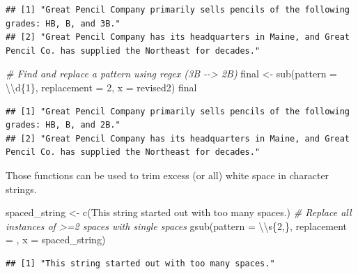 \documentclass[
]{book}
\newenvironment{Shaded}{\begin{snugshade}}{\end{snugshade}}
\newcommand{\AttributeTok}[1]{\textcolor[rgb]{0.77,0.63,0.00}{#1}}
\newcommand{\CommentTok}[1]{\textcolor[rgb]{0.56,0.35,0.01}{\textit{#1}}}
\newcommand{\FunctionTok}[1]{\textcolor[rgb]{0.00,0.00,0.00}{#1}}
\newcommand{\NormalTok}[1]{#1}
\newcommand{\OtherTok}[1]{\textcolor[rgb]{0.56,0.35,0.01}{#1}}
\newcommand{\SpecialCharTok}[1]{\textcolor[rgb]{0.00,0.00,0.00}{#1}}
\newcommand{\StringTok}[1]{\textcolor[rgb]{0.31,0.60,0.02}{#1}}
\begin{document}
\begin{verbatim}
## [1] "Great Pencil Company primarily sells pencils of the following grades: HB, B, and 3B."                            
## [2] "Great Pencil Company has its headquarters in Maine, and Great Pencil Co. has supplied the Northeast for decades."
\end{verbatim}

\begin{Shaded}
\begin{Highlighting}[]
\CommentTok{\# Find and replace a pattern using regex (3B {-}{-}\textgreater{} 2B)}
\NormalTok{final }\OtherTok{\textless{}{-}} \FunctionTok{sub}\NormalTok{(}\AttributeTok{pattern =} \StringTok{\textquotesingle{}}\SpecialCharTok{\textbackslash{}\textbackslash{}}\StringTok{d\{1\}\textquotesingle{}}\NormalTok{, }\AttributeTok{replacement =} \StringTok{\textquotesingle{}2\textquotesingle{}}\NormalTok{, }\AttributeTok{x =}\NormalTok{ revised2)}
\NormalTok{final}
\end{Highlighting}
\end{Shaded}

\begin{verbatim}
## [1] "Great Pencil Company primarily sells pencils of the following grades: HB, B, and 2B."                            
## [2] "Great Pencil Company has its headquarters in Maine, and Great Pencil Co. has supplied the Northeast for decades."
\end{verbatim}

Those functions can be used to trim excess (or all) white space in character strings.

\begin{Shaded}
\begin{Highlighting}[]
\NormalTok{spaced\_string }\OtherTok{\textless{}{-}} \FunctionTok{c}\NormalTok{(}\StringTok{\textquotesingle{}This      string    started  out with too    many    spaces.\textquotesingle{}}\NormalTok{)}
\CommentTok{\# Replace all instances of \textgreater{}=2 spaces with single spaces}
\FunctionTok{gsub}\NormalTok{(}\AttributeTok{pattern =} \StringTok{\textquotesingle{}}\SpecialCharTok{\textbackslash{}\textbackslash{}}\StringTok{s\{2,\}\textquotesingle{}}\NormalTok{, }\AttributeTok{replacement =} \StringTok{\textquotesingle{} \textquotesingle{}}\NormalTok{, }\AttributeTok{x =}\NormalTok{ spaced\_string)}
\end{Highlighting}
\end{Shaded}

\begin{verbatim}
## [1] "This string started out with too many spaces."
\end{verbatim}
\end{document}
